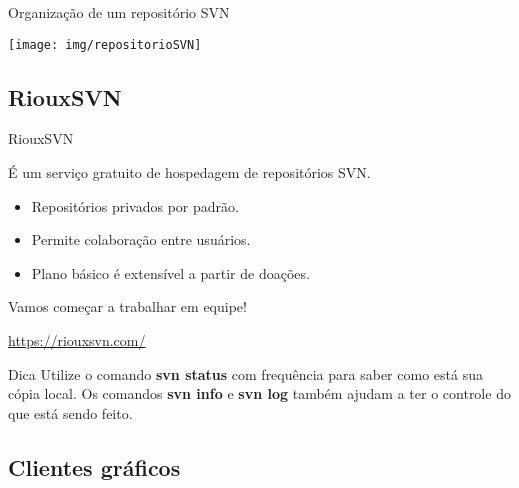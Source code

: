 \documentclass[a4paper]{beamer}
\begin{document}
%

\begin{frame}{Organização de um repositório SVN}

\begin{center}
\texttt{[image: img/repositorioSVN]}
\end{center}

\end{frame}


\subsection{RiouxSVN}

\begin{frame}{RiouxSVN}

É um serviço gratuito de hospedagem de repositórios SVN.

\begin{itemize}
\item Repositórios privados por padrão.
\item Permite colaboração entre usuários.
\item Plano básico é extensível a partir de doações.
\end{itemize}

Vamos começar a trabalhar em equipe!
\begin{center}
\url{https://riouxsvn.com/}
\end{center}

\begin{block}{Dica}
Utilize o comando \textbf{svn status} com frequência para saber como está sua cópia local. Os comandos \textbf{svn info} e \textbf{svn log} também ajudam a ter o controle do que está sendo feito.
\end{block}

\end{frame}

\subsection{Clientes gráficos}
\end{document}
